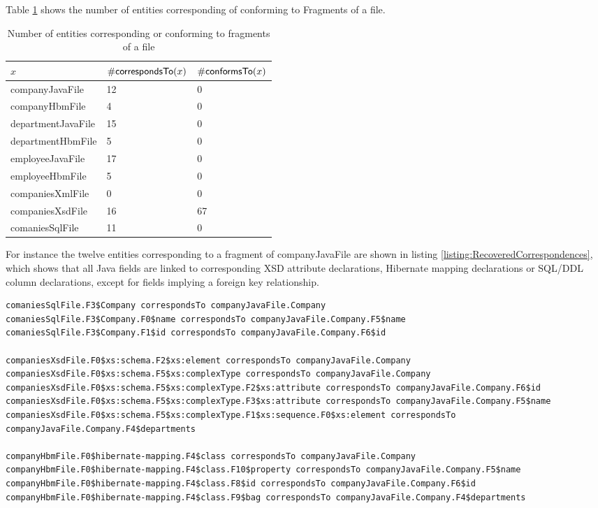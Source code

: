 Table \ref{table:NumberOfEntitiesCorrespondingOrConformingToFragmentsOfAFile} shows the number of entities corresponding of conforming to \glspl{Fragment} of a file.
\begin{table}[h!]
\begin{center}
\begin{tabular}{|l|l|l|}
\hline
$x$ & $\#\textsf{correspondsTo}(x)$ & $\#\textsf{conformsTo}(x)$
\\ \hline
companyJavaFile & 12 & 0 
\\ \hline
companyHbmFile & 4 & 0 
\\ \hline
departmentJavaFile & 15 & 0 
\\ \hline
departmentHbmFile & 5 & 0 
\\ \hline
employeeJavaFile & 17 & 0 
\\ \hline
employeeHbmFile & 5 & 0 
\\ \hline
companiesXmlFile & 0 & 0 
\\ \hline
companiesXsdFile & 16 & 67 
\\ \hline
comaniesSqlFile & 11 & 0 
\\ \hline 
\end{tabular}
\end{center}
\caption{Number of entities corresponding or conforming to fragments of a file}
\label{table:NumberOfEntitiesCorrespondingOrConformingToFragmentsOfAFile}
\end{table}
For instance the twelve entities corresponding to a fragment of companyJavaFile are shown in listing \ref{listing:RecoveredCorrespondences}, which shows that all \gls{Java} fields are linked to corresponding \gls{XSD} attribute declarations, \gls{Hibernate} mapping declarations or \gls{SQL/DDL} column declarations, except for fields implying a foreign key relationship.
\begin{lstlisting}[caption={Recovered Correspondences},label={listing:RecoveredCorrespondences}]
comaniesSqlFile.F3$Company correspondsTo companyJavaFile.Company
comaniesSqlFile.F3$Company.F0$name correspondsTo companyJavaFile.Company.F5$name
comaniesSqlFile.F3$Company.F1$id correspondsTo companyJavaFile.Company.F6$id

companiesXsdFile.F0$xs:schema.F2$xs:element correspondsTo companyJavaFile.Company
companiesXsdFile.F0$xs:schema.F5$xs:complexType correspondsTo companyJavaFile.Company
companiesXsdFile.F0$xs:schema.F5$xs:complexType.F2$xs:attribute correspondsTo companyJavaFile.Company.F6$id
companiesXsdFile.F0$xs:schema.F5$xs:complexType.F3$xs:attribute correspondsTo companyJavaFile.Company.F5$name
companiesXsdFile.F0$xs:schema.F5$xs:complexType.F1$xs:sequence.F0$xs:element correspondsTo companyJavaFile.Company.F4$departments

companyHbmFile.F0$hibernate-mapping.F4$class correspondsTo companyJavaFile.Company
companyHbmFile.F0$hibernate-mapping.F4$class.F10$property correspondsTo companyJavaFile.Company.F5$name
companyHbmFile.F0$hibernate-mapping.F4$class.F8$id correspondsTo companyJavaFile.Company.F6$id
companyHbmFile.F0$hibernate-mapping.F4$class.F9$bag correspondsTo companyJavaFile.Company.F4$departments
\end{lstlisting}

